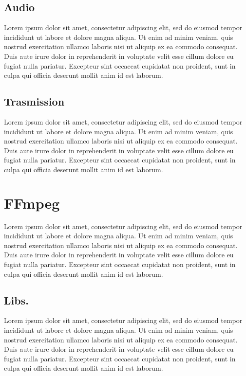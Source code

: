 \subsection{Audio}
Lorem ipsum dolor sit amet, consectetur adipiscing elit, sed do eiusmod tempor incididunt ut labore et dolore magna aliqua. Ut enim ad minim veniam, quis nostrud exercitation ullamco laboris nisi ut aliquip ex ea commodo consequat. Duis aute irure dolor in reprehenderit in voluptate velit esse cillum dolore eu fugiat nulla pariatur. Excepteur sint occaecat cupidatat non proident, sunt in culpa qui officia deserunt mollit anim id est laborum.

\subsection{Trasmission}
Lorem ipsum dolor sit amet, consectetur adipiscing elit, sed do eiusmod tempor incididunt ut labore et dolore magna aliqua. Ut enim ad minim veniam, quis nostrud exercitation ullamco laboris nisi ut aliquip ex ea commodo consequat. Duis aute irure dolor in reprehenderit in voluptate velit esse cillum dolore eu fugiat nulla pariatur. Excepteur sint occaecat cupidatat non proident, sunt in culpa qui officia deserunt mollit anim id est laborum.



\section{FFmpeg}
Lorem ipsum dolor sit amet, consectetur adipiscing elit, sed do eiusmod tempor incididunt ut labore et dolore magna aliqua. Ut enim ad minim veniam, quis nostrud exercitation ullamco laboris nisi ut aliquip ex ea commodo consequat. Duis aute irure dolor in reprehenderit in voluptate velit esse cillum dolore eu fugiat nulla pariatur. Excepteur sint occaecat cupidatat non proident, sunt in culpa qui officia deserunt mollit anim id est laborum\cite{FFmpeg_Documentation}.

\subsection{Libs.}
Lorem ipsum dolor sit amet, consectetur adipiscing elit, sed do eiusmod tempor incididunt ut labore et dolore magna aliqua. Ut enim ad minim veniam, quis nostrud exercitation ullamco laboris nisi ut aliquip ex ea commodo consequat. Duis aute irure dolor in reprehenderit in voluptate velit esse cillum dolore eu fugiat nulla pariatur. Excepteur sint occaecat cupidatat non proident, sunt in culpa qui officia deserunt mollit anim id est laborum.



